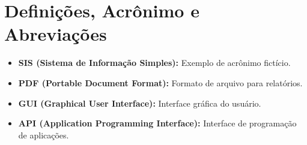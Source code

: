 
\section{Definições, Acrônimo e Abreviações}

\begin{itemize}
    \item \textbf{SIS (Sistema de Informação Simples):} Exemplo de acrônimo fictício.
    \item \textbf{PDF (Portable Document Format):} Formato de arquivo para relatórios.
    \item \textbf{GUI (Graphical User Interface):} Interface gráfica do usuário.
    \item \textbf{API (Application Programming Interface):} Interface de programação de aplicações.
\end{itemize}
